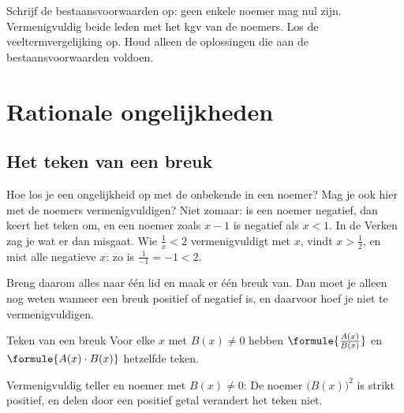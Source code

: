 \begin{oefeningen}
\end{oefeningen}

\begin{werkwijze}
Schrijf de bestaansvoorwaarden op: geen enkele noemer mag nul zijn. Vermenigvuldig beide leden met het kgv van de noemers. Los de veeltermvergelijking op. Houd alleen de oplossingen die aan de bestaansvoorwaarden voldoen.
\end{werkwijze}

\begin{oefeningen}
\end{oefeningen}

\section{Rationale ongelijkheden}

\subsection{Het teken van een breuk}

Hoe los je een ongelijkheid op met de onbekende in een noemer? Mag je ook hier met de noemers vermenigvuldigen? Niet zomaar: is een noemer negatief, dan keert het teken om, en een noemer zoals $x - 1$ is negatief als $x < 1$. In de Verken zag je wat er dan misgaat. Wie $\frac1x < 2$ vermenigvuldigt met $x$, vindt $x > \frac12$, en mist alle negatieve $x$: zo is $\frac{1}{-1} = -1 < 2$.

Breng daarom alles naar één lid en maak er één breuk van. Dan moet je alleen nog weten wanneer een breuk positief of negatief is, en daarvoor hoef je niet te vermenigvuldigen.

\begin{theorie}
\begin{stelling}{Teken van een breuk}
Voor elke $x$ met $B(x) \neq 0$ hebben \quad $\formule{\frac{A(x)}{B(x)}}$ \quad en \quad $\formule{A(x) \cdot B(x)}$ \quad hetzelfde teken.
\end{stelling}

\begin{bewijs}
Vermenigvuldig teller en noemer met $B(x) \neq 0$:
De noemer $\bigl(B(x)\bigr)^2$ is strikt positief, en delen door een positief getal verandert het teken niet.
\end{bewijs}
\end{theorie}


